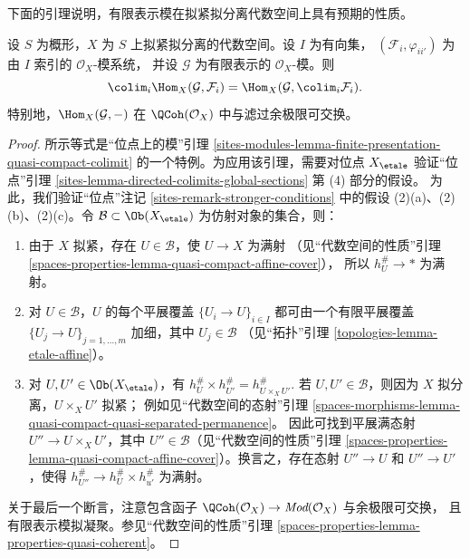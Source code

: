 \noindent
下面的引理说明，有限表示模在拟紧拟分离代数空间上具有预期的性质。

\begin{lemma}
\label{lemma-finite-presentation-quasi-compact-colimit}
设 $S$ 为概形，$X$ 为 $S$ 上拟紧拟分离的代数空间。设 $I$ 为有向集，
$(\mathcal{F}_i, \varphi_{ii'})$ 为由 $I$ 索引的 $\mathcal{O}_X$-模系统，
并设 $\mathcal{G}$ 为有限表示的 $\mathcal{O}_X$-模。则
$$
\colim_i \Hom_X(\mathcal{G}, \mathcal{F}_i)
=
\Hom_X(\mathcal{G}, \colim_i \mathcal{F}_i).
$$
特别地，$\Hom_X(\mathcal{G}, -)$ 在 $\QCoh(\mathcal{O}_X)$ 中与滤过余极限可交换。
\end{lemma}

\begin{proof}
所示等式是“位点上的模”引理
\ref{sites-modules-lemma-finite-presentation-quasi-compact-colimit}
的一个特例。为应用该引理，需要对位点 $X_\etale$ 验证“位点”引理
\ref{sites-lemma-directed-colimits-global-sections} 第 (4) 部分的假设。
为此，我们验证“位点”注记 \ref{sites-remark-stronger-conditions}
中的假设 (2)(a)、(2)(b)、(2)(c)。令
$\mathcal{B} \subset \Ob(X_\etale)$ 为仿射对象的集合，则：
\begin{enumerate}
\item 由于 $X$ 拟紧，存在 $U \in \mathcal{B}$，使 $U \to X$ 为满射
（见“代数空间的性质”引理
\ref{spaces-properties-lemma-quasi-compact-affine-cover}），
所以 $h_U^\# \to *$ 为满射。
\item 对 $U \in \mathcal{B}$，$U$ 的每个平展覆盖
$\{U_i \to U\}_{i \in I}$ 都可由一个有限平展覆盖
$\{U_j \to U\}_{j = 1, \ldots, m}$ 加细，其中 $U_j \in \mathcal{B}$
（见“拓扑”引理 \ref{topologies-lemma-etale-affine}）。
\item 对 $U, U' \in \Ob(X_\etale)$，有
$h_U^\# \times h_{U'}^\# = h_{U \times_X U'}^\#$.
若 $U, U' \in \mathcal{B}$，则因为 $X$ 拟分离，$U \times_X U'$ 拟紧；
例如见“代数空间的态射”引理
\ref{spaces-morphisms-lemma-quasi-compact-quasi-separated-permanence}。
因此可找到平展满态射 $U'' \to U \times_X U'$，其中
$U'' \in \mathcal{B}$（见“代数空间的性质”引理
\ref{spaces-properties-lemma-quasi-compact-affine-cover}）。换言之，存在态射
$U'' \to U$ 和 $U'' \to U'$，使得
$h_{U''}^\# \to h_U^\# \times h_{u'}^\#$ 为满射。
\end{enumerate}
关于最后一个断言，注意包含函子
$\QCoh(\mathcal{O}_X) \to \textit{Mod}(\mathcal{O}_X)$ 与余极限可交换，
且有限表示模拟凝聚。参见“代数空间的性质”引理
\ref{spaces-properties-lemma-properties-quasi-coherent}。
\end{proof}





